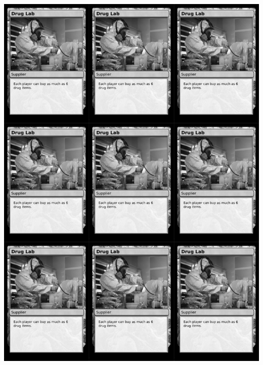 \documentclass[a4paper]{article}
\begin{document}
\newpage

\begin{center}
	\centering
	\includegraphics[width=200.5mm,height=280.7mm]{output/temp/page20.png}
\end{center}
\end{document}
